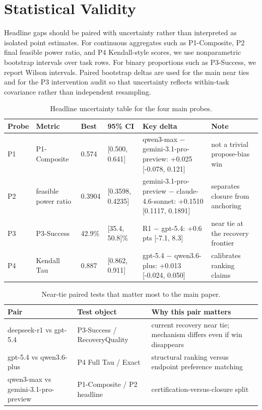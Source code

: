 \section{Statistical Validity}

Headline gaps should be paired with uncertainty rather than interpreted as isolated point estimates. For continuous aggregates such as P1-Composite, P2 final feasible power ratio, and P4 Kendall-style scores, we use nonparametric bootstrap intervals over task rows. For binary proportions such as P3-Success, we report Wilson intervals. Paired bootstrap deltas are used for the main near ties and for the P3 intervention audit so that uncertainty reflects within-task covariance rather than independent resampling.

\begin{table}[t]
\caption{Headline uncertainty table for the four main probes.}
\label{tab:appendix_ci_table}
\centering
\scriptsize
\setlength{\tabcolsep}{3.5pt}
\renewcommand{\arraystretch}{1.08}
\begin{tabular}{lp{23mm}p{18mm}p{23mm}p{25mm}p{36mm}}
\toprule
Probe & Metric & Best & 95\% CI & Key delta & Note \\
\midrule
P1 & P1-Composite & 0.574 & [0.500, 0.641] & qwen3-max $-$ gemini-3.1-pro-preview: +0.025 [-0.078, 0.121] & not a trivial propose-bias win \\
P2 & feasible power ratio & 0.3904 & [0.3598, 0.4235] & gemini-3.1-pro-preview $-$ claude-4.6-sonnet: +0.1510 [0.1117, 0.1891] & separates closure from anchoring \\
P3 & P3-Success & 42.9\% & [35.4, 50.8]\% & R1 $-$ gpt-5.4: +0.6 pts [-7.1, 8.3] & near tie at the recovery frontier \\
P4 & Kendall Tau & 0.887 & [0.862, 0.911] & gpt-5.4 $-$ qwen3.6-plus: +0.013 [-0.024, 0.050] & calibrates ranking claims \\
\bottomrule
\end{tabular}
\end{table}

\begin{table}[t]
\caption{Near-tie paired tests that matter most to the main paper.}
\label{tab:appendix_near_ties}
\centering
\scriptsize
\setlength{\tabcolsep}{3pt}
\renewcommand{\arraystretch}{1.08}
\begin{tabularx}{\textwidth}{p{32mm}p{38mm}Y}
\toprule
Pair & Test object & Why this pair matters \\
\midrule
deepseek-r1 vs gpt-5.4 & P3-Success / RecoveryQuality & current recovery near tie; mechanism differs even if win disappears \\
gpt-5.4 vs qwen3.6-plus & P4 Full Tau / Exact & structural ranking versus endpoint preference matching \\
qwen3-max vs gemini-3.1-pro-preview & P1-Composite / P2 headline & certification-versus-closure split \\
\bottomrule
\end{tabularx}
\end{table}

